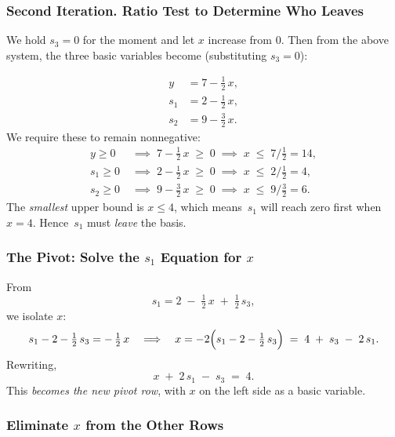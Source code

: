 \subsubsection*{Second Iteration. Ratio Test to Determine Who Leaves}

\begin{tcolorbox}[colback=algleave!6, colframe=algleave, coltitle=white, fonttitle=\bfseries, sharp corners, title={\ding{47}\ Second Iteration: Ratio Test}]

We hold \(s_3=0\) for the moment and let \(x\) increase from \(0\).  
Then from the above system, the three basic variables become (substituting \(s_3=0\)):

\[
\begin{aligned}
y   &= 7 - \tfrac12\,x,\\
s_1 &= 2 - \tfrac12\,x,\\
s_2 &= 9 - \tfrac32\,x.
\end{aligned}
\]
We require these to remain nonnegative:
\[
\begin{aligned}
y \ge 0 \;&\implies\; 7 - \tfrac12\,x \;\ge\; 0 \;\implies\; x \;\le\; 7/\tfrac{1}{2} = 14,\\
s_1 \ge 0 \;&\implies\; 2 - \tfrac12\,x \;\ge\; 0 \;\implies\; x \;\le\; 2/\tfrac{1}{2} = 4,\\
s_2 \ge 0 \;&\implies\; 9 - \tfrac32\,x \;\ge\; 0 \;\implies\; x \;\le\; 9/\tfrac{3}{2} = 6.
\end{aligned}
\]
The \emph{smallest} upper bound is \(x \le 4\), which means \(\,s_1\) will reach zero first when \(x=4\).  
Hence \(\,s_1\) must \emph{leave} the basis.
\end{tcolorbox}
\subsubsection*{The Pivot: Solve the \(s_1\) Equation for \(x\)}

From
\[
s_1 = 2 \;-\;\tfrac12\,x \;+\;\tfrac12\,s_3,
\]
we isolate \(x\):
\[
s_1 - 2 - \tfrac12\,s_3 = -\,\tfrac12\,x
\quad\Longrightarrow\quad
x = -2\Bigl(s_1 - 2 - \tfrac12\,s_3\Bigr)
\;=\;
4 \;+\; s_3 \;-\; 2\,s_1.
\]
Rewriting,
\[
x \;+\; 2\,s_1 \;-\; s_3 
\;=\;
4.
\]
This \emph{becomes the new pivot row}, with \(x\) on the left side as a basic variable.

\subsubsection*{Eliminate \(x\) from the Other Rows}


